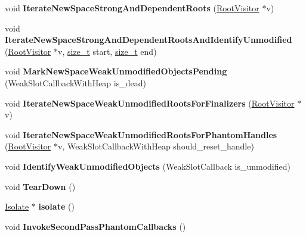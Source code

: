 \begin{DoxyCompactItemize}
void {\bfseries Iterate\+New\+Space\+Strong\+And\+Dependent\+Roots} (\mbox{\hyperlink{classv8_1_1internal_1_1RootVisitor}{Root\+Visitor}} $\ast$v)
\item 
\mbox{\label{classv8_1_1internal_1_1GlobalHandles_a595432bbf0978b8147490f1b9c7f711b}} 
void {\bfseries Iterate\+New\+Space\+Strong\+And\+Dependent\+Roots\+And\+Identify\+Unmodified} (\mbox{\hyperlink{classv8_1_1internal_1_1RootVisitor}{Root\+Visitor}} $\ast$v, \mbox{\hyperlink{classsize__t}{size\+\_\+t}} start, \mbox{\hyperlink{classsize__t}{size\+\_\+t}} end)
\item 
\mbox{\label{classv8_1_1internal_1_1GlobalHandles_a275548088e2a6e785be3ff4f70d2945e}} 
void {\bfseries Mark\+New\+Space\+Weak\+Unmodified\+Objects\+Pending} (Weak\+Slot\+Callback\+With\+Heap is\+\_\+dead)
\item 
\mbox{\label{classv8_1_1internal_1_1GlobalHandles_a3945b0c98ec220aa606fe8d6eabe494c}} 
void {\bfseries Iterate\+New\+Space\+Weak\+Unmodified\+Roots\+For\+Finalizers} (\mbox{\hyperlink{classv8_1_1internal_1_1RootVisitor}{Root\+Visitor}} $\ast$v)
\item 
\mbox{\label{classv8_1_1internal_1_1GlobalHandles_a9e3d10d11ecde9acd7e69d7aa1789b71}} 
void {\bfseries Iterate\+New\+Space\+Weak\+Unmodified\+Roots\+For\+Phantom\+Handles} (\mbox{\hyperlink{classv8_1_1internal_1_1RootVisitor}{Root\+Visitor}} $\ast$v, Weak\+Slot\+Callback\+With\+Heap should\+\_\+reset\+\_\+handle)
\item 
\mbox{\label{classv8_1_1internal_1_1GlobalHandles_a3af4aba6d067411dac31c436a3a71431}} 
void {\bfseries Identify\+Weak\+Unmodified\+Objects} (Weak\+Slot\+Callback is\+\_\+unmodified)
\item 
\mbox{\label{classv8_1_1internal_1_1GlobalHandles_a08ae35c499746d53695855f3fa478777}} 
void {\bfseries Tear\+Down} ()
\item 
\mbox{\label{classv8_1_1internal_1_1GlobalHandles_af52a3cdd14e9d051a3668250091305b1}} 
\mbox{\hyperlink{classv8_1_1internal_1_1Isolate}{Isolate}} $\ast$ {\bfseries isolate} ()
\item 
\mbox{\label{classv8_1_1internal_1_1GlobalHandles_a0de9ef6a1926b14e82c880e409ed6edf}} 
void {\bfseries Invoke\+Second\+Pass\+Phantom\+Callbacks} ()
\end{DoxyCompactItemize}
